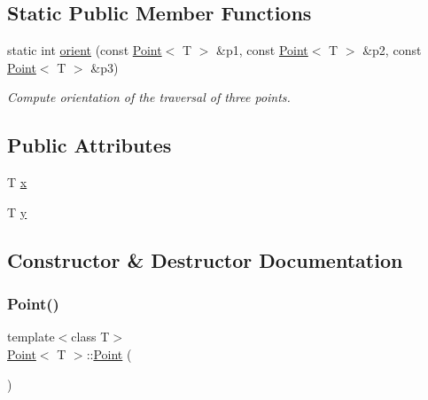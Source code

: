 \subsection*{Static Public Member Functions}
\begin{DoxyCompactItemize}
\item 
static int \mbox{\hyperlink{classPoint_a33e4f445ed5dfc1a5f8cca8177c1a9c5}{orient}} (const \mbox{\hyperlink{classPoint}{Point}}$<$ T $>$ \&p1, const \mbox{\hyperlink{classPoint}{Point}}$<$ T $>$ \&p2, const \mbox{\hyperlink{classPoint}{Point}}$<$ T $>$ \&p3)
\begin{DoxyCompactList}\small\item\em Compute orientation of the traversal of three points. \end{DoxyCompactList}\end{DoxyCompactItemize}
\subsection*{Public Attributes}
\begin{DoxyCompactItemize}
\item 
T \mbox{\hyperlink{classPoint_a401d07562afaf0079121218025e66b76}{x}}
\item 
T \mbox{\hyperlink{classPoint_a65146418a33ebb2cd9acb85cade60ac9}{y}}
\end{DoxyCompactItemize}


\subsection{Constructor \& Destructor Documentation}
\mbox{\label{classPoint_aea76b1130f1a203722d8f2254ced8e66}} 
\subsubsection{\texorpdfstring{Point()}{Point()}\hspace{0.1cm}{\footnotesize\ttfamily [1/2]}}
{\footnotesize\ttfamily template$<$class T$>$ \\
\mbox{\hyperlink{classPoint}{Point}}$<$ T $>$\+::\mbox{\hyperlink{classPoint}{Point}} (\begin{DoxyParamCaption}{ }\end{DoxyParamCaption})\hspace{0.3cm}{\ttfamily [inline]}}

\mbox{\label{classPoint_a6583d71c9cddfe6e079135c724ea228c}} 
